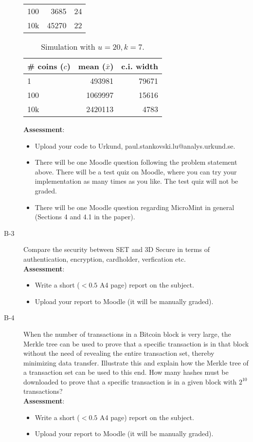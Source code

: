 \documentclass{article}
\begin{document}
\begin{description}
{\begin{table}[h]
\begin{tabular}{lrr}
	100    &       3685 &       24 \\

	10k    &      45270 &       22 \\
	\bottomrule
	\end{tabular}
	\end{table}
	
	\begin{table}[h]
	\centering
	\caption{Simulation with $u = 20, k = 7$.}
	\begin{tabular}{lrr}
	\toprule
	\# coins ($c$) & mean ($\bar{x}$) & c.i. width \\
	\midrule
	1      &     493981 &    79671 \\
	100    &    1069997 &    15616 \\
	10k    &    2420113 &     4783 \\
	\bottomrule
	\end{tabular}
	\end{table}

	\textbf{Assessment}:
	\begin{itemize}
		\item Upload your code to Urkund, paul.stankovski.lu@analys.urkund.se.
		\item There will be one Moodle question following the problem statement above.
		There will be a test quiz on Moodle, where you can try your implementation as many times as you like.
		The test quiz will not be graded.
		\item There will be one Moodle question regarding MicroMint in general (Sections 4 and 4.1 in the paper).
	\end{itemize}
	}

	\item[B-3]{Compare the security between SET and 3D Secure in terms of authentication, encryption, cardholder, verfication etc.\\
	\textbf{Assessment}:
	\begin{itemize}
		\item Write a short ($< 0.5$ A4 page) report on the subject.
		\item Upload your report to Moodle (it will be manually graded).
	\end{itemize}
	}

	\item[B-4]{When the number of transactions in a Bitcoin block is very large, the Merkle tree can be used to
	prove that a specific transaction is in that block without the need of revealing the entire transaction set,
	thereby minimizing data transfer. Illustrate this and explain how the Merkle tree of a transaction set can
	be used to this end. How many hashes must be downloaded to prove that a specific transaction is in a given
	block with $2^{10}$ transactions?\\
	\textbf{Assessment}:
	\begin{itemize}
		\item Write a short ($< 0.5$ A4 page) report on the subject.
		\item Upload your report to Moodle (it will be manually graded).
	\end{itemize}
	}
\end{description}
\end{document}

